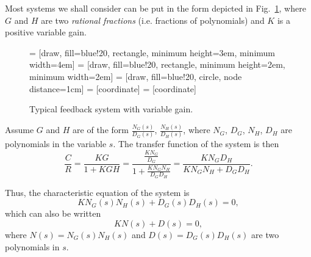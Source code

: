 \documentclass[a4paper,11pt]{report}
\theoremstyle{definition}
\begin{document}
Most systems we shall consider can be put in the form depicted in
Fig.~\ref{fig:examplesystem}, where $G$ and $H$ are two \emph{rational
  fractions} (i.e. fractions of polynomials) and $K$ is a positive
variable gain.

\begin{figure}[H]
  \centering
   = [draw, fill=blue!20, rectangle, minimum height=3em, minimum width=4em]
   = [draw, fill=blue!20, rectangle, minimum height=2em, minimum width=2em]
   = [draw, fill=blue!20, circle, node distance=1cm]
   = [coordinate]
   = [coordinate]
  \caption{Typical feedback system with variable gain.}
  \label{fig:examplesystem}
\end{figure}

Assume $G$ and $H$ are of the form $\frac{N_G(s)}{D_G(s)}$,
$\frac{N_H(s)}{D_H(s)}$, where $N_G$, $D_G$, $N_H$, $D_H$ are
polynomials in the variable $s$.  The transfer function of the system
is then
\begin{equation}
  \label{eq:cegen}
  \frac{C}{R} = \frac{KG}{1+KGH} =
  \frac{\frac{KN_G}{D_G}}{1+\frac{KN_GN_H}{D_GD_H}}  
  =  \frac{KN_GD_H}{KN_GN_H+D_GD_H}.
\end{equation}

Thus, the characteristic equation of the system is
\[
KN_G(s)N_H(s) + D_G(s)D_H(s) = 0,
\]
which can also be written
\[
KN(s)+D(s)=0,
\]
where $N(s)=N_G(s)N_H(s)$ and $D(s)=D_G(s)D_H(s)$ are two polynomials
in $s$.
\end{document}
